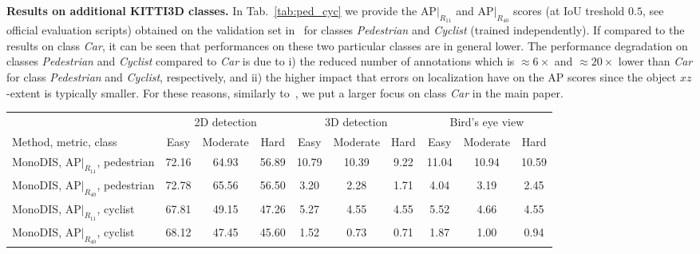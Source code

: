 \documentclass[10pt,twocolumn,letterpaper]{article}
\newcommand{\monodis}{MonoDIS}
\renewcommand{\paragraph}[1]{

        \vspace{3pt}
	\noindent\textbf{#1}}
\begin{document}
\paragraph{Results on additional KITTI3D classes.}
In Tab.~\ref{tab:ped_cyc} we provide the $\text{AP}|_{R_{11}}$ and $\text{AP}|_{R_{40}}$ scores (at IoU treshold $0.5$, see official evaluation scripts) obtained on the validation set in~\cite{NIPS2015_Chen} for classes \textit{Pedestrian} and \textit{Cyclist} (trained independently). If compared to the results on class \textit{Car}, it can be seen that performances on these two particular classes are in general lower. The performance degradation on classes \textit{Pedestrian} and \textit{Cyclist} compared to \textit{Car} is due to i) the reduced number of annotations which is $\approx6\times$ and $\approx20\times$ lower than \emph{Car} for class \textit{Pedestrian} and \textit{Cyclist}, respectively, and ii) the higher impact that errors on localization have on the AP scores since the object $xz$-extent is typically smaller. For these reasons, similarly to~\cite{Manhardt_2019_CVPR,qin2019monogrnet,Roddick18,Xu_2018_CVPR}, we put a larger focus on class \textit{Car} in the main paper. 
\begin{table*}[ht]
    \centering
    {\footnotesize
    \begin{tabular}{l|ccc|ccc|ccc}
        \toprule
        & \multicolumn{3}{c|}{2D detection} & \multicolumn{3}{c|}{3D detection} & \multicolumn{3}{c}{Bird's eye view} \\
        Method, metric, class & Easy & Moderate & Hard & Easy & Moderate & Hard & Easy & Moderate & Hard \\
        \midrule
	\monodis{}, $\text{AP}|_{R_{11}}$, pedestrian & 72.16 & 64.93 & 56.89 & 10.79 & 10.39 & 9.22 & 11.04 & 10.94 & 10.59 \\
	\monodis{}, $\text{AP}|_{R_{40}}$, pedestrian & 72.78 & 65.56 & 56.50 & 3.20 & 2.28 & 1.71 & 4.04 & 3.19 & 2.45 \\
        \midrule
	\monodis{}, $\text{AP}|_{R_{11}}$, cyclist & 67.81 & 49.15 & 47.26 & 5.27 & 4.55 & 4.55 & 5.52 & 4.66 & 4.55 \\
	\monodis{}, $\text{AP}|_{R_{40}}$, cyclist & 68.12 & 47.45 & 45.60 & 1.52 & 0.73 & 0.71 & 1.87 & 1.00 & 0.94 \\
        \bottomrule
    \end{tabular}}
    \caption{Results on the classes \textit{Pedestrian} and \textit{Cyclist} on the KITTI3D validation set (0.5 IoU threshold).}
    \label{tab:ped_cyc}
    \vspace{-12pt}
\end{table*}
\end{document}
